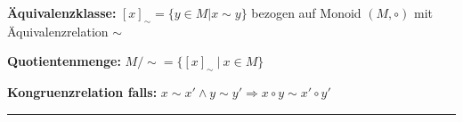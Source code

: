 \documentclass[a4paper,10pt,landscape]{article}
\begin{document}
\begin{multicols}{3}
    \textbf{Äquivalenzklasse: }
    $[x]_\sim  = \{ y  \in M | x \sim y  \}$ bezogen auf Monoid $(M, \circ)$ mit Äquivalenzrelation $\sim$
    
    \textbf{Quotientenmenge:} 
    $M /\sim =  \{ [x]_\sim \ |\ x \in M  \}$
    
    \textbf{Kongruenzrelation falls:} 
    $x \sim x' \land y\sim y' \Rightarrow x \circ y \sim x' \circ y'$
    
    \hrule
    
    \vfill\null    %

\end{multicols}
\end{document}
